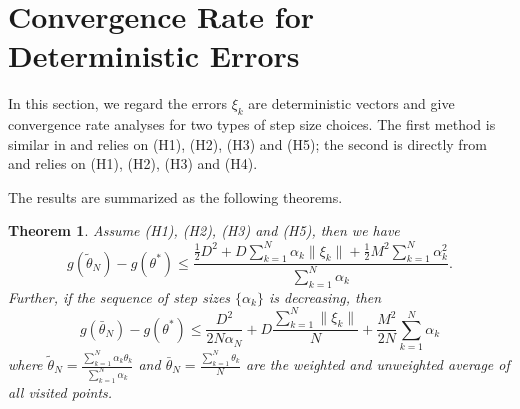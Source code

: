 \documentclass[psamsfonts]{article}
\newtheorem{thm}{Theorem} %
\theoremstyle{definition}
\theoremstyle{remark}
\numberwithin{equation} {section}
\begin{document}
\section{Convergence Rate for Deterministic Errors}

In this section, we regard the errors $\xi_k$ are deterministic vectors and give convergence rate analyses for two types of step size choices. The first method is similar in \cite{ising} and relies on (H1), (H2), (H3) and (H5); the second is directly from \cite{prox} and relies on (H1), (H2), (H3) and (H4).

The results are summarized as the following theorems.

\begin{thm}
Assume (H1), (H2), (H3) and (H5), then we have
\begin{equation}\label{weighted-avg-bound}
g(\tilde{\theta}_N) - g(\theta^*) \le \frac{\frac{1}{2}D^2 + D\sum_{k=1}^N \alpha_k \|\xi_k\| + \frac{1}{2}M^2\sum_{k=1}^N \alpha_k^2}{\sum_{k=1}^N \alpha_k}.
\end{equation}
Further, if the sequence of step sizes $\{\alpha_k\}$ is decreasing, then
\begin{equation}\label{unweighted-avg-bound}
g(\bar{\theta}_N) - g(\theta^*) \le \frac{D^2}{2N\alpha_N} + D\frac{\sum_{k=1}^N \|\xi_k\|}{N} + \frac{M^2}{2N}\sum_{k=1}^N \alpha_k
\end{equation}
where $\tilde{\theta}_N = \frac{\sum_{k = 1}^N \alpha_k \theta_k}{\sum_{k = 1}^N \alpha_k}$ and $\bar{\theta}_N = \frac{\sum_{k = 1}^N \theta_k}{N}$ are the weighted and unweighted average of all visited points.
\end{thm}
\end{document}
